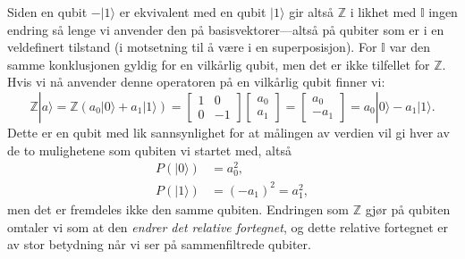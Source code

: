 Siden en qubit $-|1\rangle$ er ekvivalent med en qubit $|1\rangle$ gir altså $\mathbb{Z}$ i likhet med $\mathbb{I}$ ingen endring så lenge vi anvender den på basisvektorer---altså på qubiter som er i en veldefinert tilstand (i motsetning til å være i en superposisjon). For $\mathbb{I}$ var den samme konklusjonen gyldig for en vilkårlig qubit, men det er ikke tilfellet for $\mathbb{Z}$. Hvis vi nå anvender denne operatoren på en vilkårlig qubit finner vi:
\begin{displaymath}
	\mathbb{Z}|a\rangle = \mathbb{Z}(a_0|0\rangle + a_1|1\rangle)= \left[\begin{array}{cc}1 & 0 \\ 0 & -1 \end{array}\right]\left[\begin{array}{c} a_0 \\ a_1\end{array}\right] 
	= \left[\begin{array}{c} a_0 \\ -a_1\end{array}\right] = a_0|0\rangle - a_1|1\rangle.
\end{displaymath}
Dette er en qubit med lik sannsynlighet for at målingen av verdien vil gi hver av de to mulighetene som qubiten vi startet med, altså
\begin{align*}
	P(|0\rangle) &= a_0^2, \\
	P(|1\rangle) &= (-a_1)^2 = a_1^2,
\end{align*}
men det er fremdeles ikke den samme qubiten. Endringen som $\mathbb{Z}$ gjør på qubiten omtaler vi som at den \emph{endrer det relative fortegnet}, og dette relative fortegnet er av stor betydning når vi ser på sammenfiltrede qubiter.

